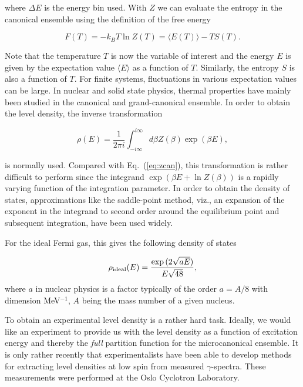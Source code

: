 \documentclass[%
oneside,                 %
final,                   %
10pt]{article}
\begin{document}
where $\Delta E$ is the energy bin used.  With $Z$ we can evaluate the
entropy in the canonical ensemble using the definition of the free
energy

\begin{equation}
     F(T)= -k_B T \ln Z(T)=\langle E(T)\rangle - TS(T).
\end{equation}

Note that the temperature $T$ is now the variable of interest and the
energy $E$ is given by the expectation value $\langle E\rangle$ as a
function of $T$. Similarly, the entropy $S$ is also a function of $T$.
For finite systems, fluctuations in various expectation values can be
large.  In nuclear and solid state physics, thermal properties have
mainly been studied in the canonical and grand-canonical ensemble.  In
order to obtain the level density, the inverse transformation

\begin{equation}
      \rho(E) =\frac{1}{2\pi i}\int_{-i\infty}^{i\infty}
 d\beta Z(\beta) \exp{(\beta E)},
      \label{eq:zbigcan}
\end{equation}

is normally used. Compared with Eq.\ (\ref{eq:zcan}), this
transformation is rather difficult to perform since the integrand
$\exp{\left(\beta E+ \ln Z(\beta)\right)}$ is a rapidly varying
function of the integration parameter. In order to obtain the density
of states, approximations like the saddle-point method, viz., an
expansion of the exponent in the integrand to second order around the
equilibrium point and subsequent integration, have been used widely.

For the ideal Fermi gas, this gives the following density of states

\begin{equation}
      \rho_{\rm ideal}(E)=\frac{\exp{(2\sqrt{aE})}}{E\sqrt{48}},
      \label{eq:omegaideal}
\end{equation}
where $a$ in nuclear physics is a factor 
typically of the order $a=A/8$ with dimension 
MeV$^{-1}$, $A$ being the mass number of a given nucleus. 

To obtain an experimental level density is a rather hard task.
Ideally, we would like an experiment to provide us with the level
density as a function of excitation energy and thereby the \emph{full}
partition function for the microcanonical ensemble.  It is only rather
recently that experimentalists have been able to develop methods for
extracting level densities at low spin from measured $\gamma$-spectra.
These measurements were performed at the Oslo Cyclotron Laboratory.
\end{document}
